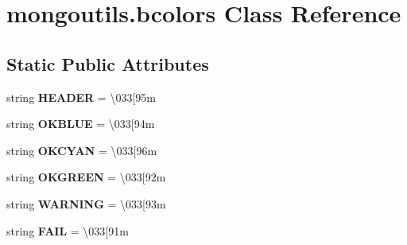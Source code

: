 \hypertarget{classmongoutils_1_1bcolors}{}\section{mongoutils.\+bcolors Class Reference}
\label{classmongoutils_1_1bcolors}
\subsection*{Static Public Attributes}
\begin{DoxyCompactItemize}
\item 
\mbox{\label{classmongoutils_1_1bcolors_acc3d469b1035e2566ef45fe9a52eadc1}} 
string {\bfseries H\+E\+A\+D\+ER} = \textquotesingle{}\textbackslash{}033\mbox{[}95m\textquotesingle{}
\item 
\mbox{\label{classmongoutils_1_1bcolors_a2749508660fee0a311a89c4eb27b6ddb}} 
string {\bfseries O\+K\+B\+L\+UE} = \textquotesingle{}\textbackslash{}033\mbox{[}94m\textquotesingle{}
\item 
\mbox{\label{classmongoutils_1_1bcolors_a24c52c61d75e8be7b7bf32100b3f12af}} 
string {\bfseries O\+K\+C\+Y\+AN} = \textquotesingle{}\textbackslash{}033\mbox{[}96m\textquotesingle{}
\item 
\mbox{\label{classmongoutils_1_1bcolors_a02349c7ee9b31866261602ceb3c94c7f}} 
string {\bfseries O\+K\+G\+R\+E\+EN} = \textquotesingle{}\textbackslash{}033\mbox{[}92m\textquotesingle{}
\item 
\mbox{\label{classmongoutils_1_1bcolors_af8956c2ca03a3953bd7c171f32f8466e}} 
string {\bfseries W\+A\+R\+N\+I\+NG} = \textquotesingle{}\textbackslash{}033\mbox{[}93m\textquotesingle{}
\item 
\mbox{\label{classmongoutils_1_1bcolors_a9a94bae19b9bd234dfe3ce0cfd29a7d4}} 
string {\bfseries F\+A\+IL} = \textquotesingle{}\textbackslash{}033\mbox{[}91m\textquotesingle{}
\item 
\mbox{\label{classmongoutils_1_1bcolors_abdd175e0ae6545e4bd63b44431b97592}} 

\end{DoxyCompactItemize}
